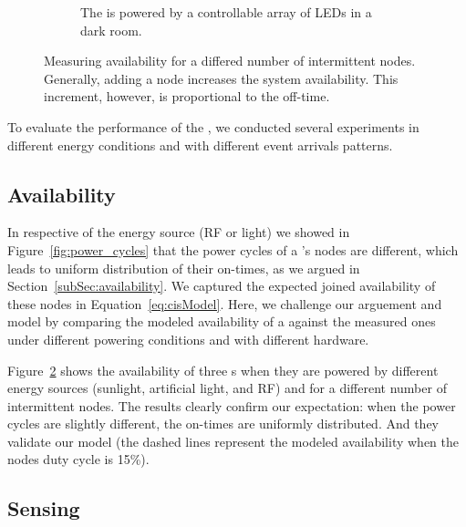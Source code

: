 \begin{figure}[h]
\begin{subfigure}{.66\columnwidth}
                \caption{The \cis is powered by a controllable array of LEDs in a dark room. \vspace{1em}}
            \label{fig:rfPwrCIS}
        \end{subfigure}
        \caption{Measuring \fullcis availability for a differed number of intermittent nodes. Generally, adding a node increases the system availability. This increment, however, is proportional to the \cis off-time.}
        \label{fig:pwrCIS}
\end{figure} 
To evaluate the performance of the \fullcis, we conducted several experiments in different energy conditions and with different event arrivals patterns. 
%
\subsection{Availability}
In respective of the energy source (RF or light) we showed in Figure~\ref{fig:power_cycles} that the power cycles of a \cis's nodes are different, which leads to uniform distribution of their on-times, as we argued in Section~\ref{subSec:availability}. We captured the expected joined availability of these nodes in Equation~\ref{eq:cisModel}.  Here, we challenge our arguement and model by comparing the modeled availability of a \cis against the measured ones under different powering conditions and with different hardware. 
 
Figure~\ref{fig:pwrCIS} shows the availability of three \cis{}s when they are powered by different energy sources (sunlight, artificial light, and RF) and for a different number of intermittent nodes.
The results clearly confirm our expectation: when the power cycles are slightly different, the on-times are uniformly distributed. And they validate our model (the dashed lines represent the modeled availability when the nodes duty cycle is 15\%).

\subsection{Sensing}

